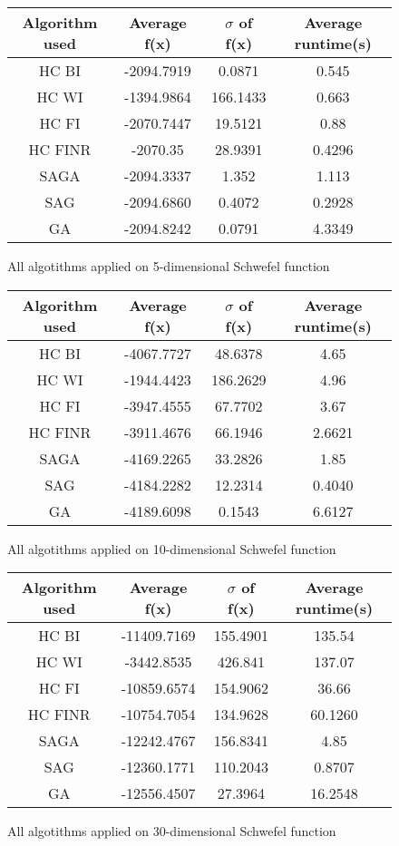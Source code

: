 \documentclass{article}
\begin{document}
\begin{figure}[H]
	\begin{tabular}{|c||c|c|c|} \hline
		Algorithm used & Average f(x) & $\sigma$ of f(x) & Average runtime(s) \\ \hline \hline
		HC BI & -2094.7919 & 0.0871 & 0.545 \\ \hline
		HC WI & -1394.9864 & 166.1433 & 0.663 \\ \hline
		HC FI & -2070.7447 & 19.5121 & 0.88 \\ \hline
		HC FINR & -2070.35 & 28.9391 & 0.4296 \\ \hline
		SAGA & -2094.3337 & 1.352 & 1.113 \\ \hline
		SAG & -2094.6860 & 0.4072 & 0.2928 \\ \hline
        GA & -2094.8242 & 0.0791 & 4.3349 \\ \hline
\end{tabular}
\caption{All algotithms applied on 5-dimensional Schwefel function}
\end{figure}

\begin{figure}[H]
	\begin{tabular}{|c||c|c|c|} \hline
		Algorithm used & Average f(x) & $\sigma$ of f(x) & Average runtime(s) \\ \hline \hline
		HC BI & -4067.7727 & 48.6378 & 4.65 \\ \hline
		HC WI & -1944.4423 & 186.2629 & 4.96 \\ \hline
		HC FI & -3947.4555 & 67.7702 & 3.67 \\ \hline
		HC FINR & -3911.4676 & 66.1946 & 2.6621 \\ \hline
		SAGA & -4169.2265 & 33.2826 & 1.85 \\ \hline
		SAG & -4184.2282 & 12.2314 & 0.4040 \\ \hline
        GA & -4189.6098 & 0.1543 & 6.6127 \\ \hline
\end{tabular}
\caption{All algotithms applied on 10-dimensional Schwefel function}
\end{figure}

\begin{figure}[H]
	\begin{tabular}{|c||c|c|c|} \hline
		Algorithm used & Average f(x) & $\sigma$ of f(x) & Average runtime(s) \\ \hline \hline
		HC BI & -11409.7169 & 155.4901 & 135.54 \\ \hline
		HC WI & -3442.8535 & 426.841 & 137.07 \\ \hline
		HC FI & -10859.6574 & 154.9062 & 36.66 \\ \hline
		HC FINR & -10754.7054 & 134.9628 & 60.1260 \\ \hline
		SAGA & -12242.4767 & 156.8341 & 4.85 \\ \hline
		SAG & -12360.1771 & 110.2043 & 0.8707 \\ \hline
        GA & -12556.4507 & 27.3964 & 16.2548 \\ \hline
\end{tabular}
\caption{All algotithms applied on 30-dimensional Schwefel function}
\end{figure}
\end{document}
